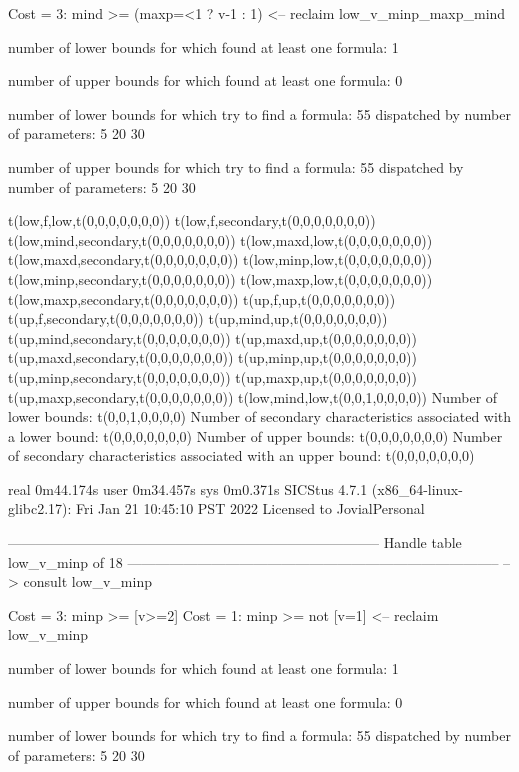 Cost =  3:  mind >= (maxp=<1 ? v-1 : 1)
<-- reclaim low_v_minp_maxp_mind

number of lower bounds for which found at least one formula: 1

number of upper bounds for which found at least one formula: 0

number of lower bounds for which try to find a formula: 55
dispatched by number of parameters: 5  20  30

number of upper bounds for which try to find a formula: 55
dispatched by number of parameters: 5  20  30

t(low,f,low,t(0,0,0,0,0,0,0))
t(low,f,secondary,t(0,0,0,0,0,0,0))
t(low,mind,secondary,t(0,0,0,0,0,0,0))
t(low,maxd,low,t(0,0,0,0,0,0,0))
t(low,maxd,secondary,t(0,0,0,0,0,0,0))
t(low,minp,low,t(0,0,0,0,0,0,0))
t(low,minp,secondary,t(0,0,0,0,0,0,0))
t(low,maxp,low,t(0,0,0,0,0,0,0))
t(low,maxp,secondary,t(0,0,0,0,0,0,0))
t(up,f,up,t(0,0,0,0,0,0,0))
t(up,f,secondary,t(0,0,0,0,0,0,0))
t(up,mind,up,t(0,0,0,0,0,0,0))
t(up,mind,secondary,t(0,0,0,0,0,0,0))
t(up,maxd,up,t(0,0,0,0,0,0,0))
t(up,maxd,secondary,t(0,0,0,0,0,0,0))
t(up,minp,up,t(0,0,0,0,0,0,0))
t(up,minp,secondary,t(0,0,0,0,0,0,0))
t(up,maxp,up,t(0,0,0,0,0,0,0))
t(up,maxp,secondary,t(0,0,0,0,0,0,0))
t(low,mind,low,t(0,0,1,0,0,0,0))
Number of lower bounds:                                             t(0,0,1,0,0,0,0)
Number of secondary characteristics associated with a lower bound:  t(0,0,0,0,0,0,0)
Number of upper bounds:                                             t(0,0,0,0,0,0,0)
Number of secondary characteristics associated with an upper bound: t(0,0,0,0,0,0,0)

real	0m44.174s
user	0m34.457s
sys	0m0.371s
SICStus 4.7.1 (x86_64-linux-glibc2.17): Fri Jan 21 10:45:10 PST 2022
Licensed to JovialPersonal


--------------------------------------------------------------------------------
Handle table low_v_minp of 18
--------------------------------------------------------------------------------
--> consult low_v_minp

Cost =  3:  minp >= [v>=2]
Cost =  1:  minp >= not [v=1]
<-- reclaim low_v_minp

number of lower bounds for which found at least one formula: 1

number of upper bounds for which found at least one formula: 0

number of lower bounds for which try to find a formula: 55
dispatched by number of parameters: 5  20  30

